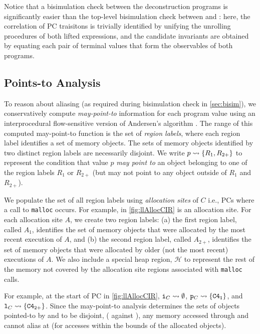 Notice that a bisimulation check between the deconstruction programs is
significantly easier than the top-level bisimulation check between \sprog{} and \cprog{}:
here, the correlation of PC traisitons is trivially identified by unifying the
unrolling procedures of both lifted expressions, and the candidate invariants
are obtained by equating each pair of terminal values that form the observables
of both programs.

\subsection{Points-to Analysis}
\label{sec:pointsTo}
To reason about aliasing (as required during bisimulation check in \cref{sec:bisim}),
we conservatively compute {\em may-point-to} information for each program value using
an interprocedural flow-sensitive version of Andersen's algorithm \cite{andersen94programanalysis}.
The range of this computed may-point-to function is the set of {\em region labels},
where each region label identifies a set of memory objects.
The sets of memory objects identified by two distinct region labels
are necessarily disjoint.
We write $p \rightsquigarrow{} \{ R_1, R_{2+} \}$ to represent the condition that value $p$
{\em may point to} an object belonging to one of the region labels $R_1$ or $R_{2+}$
(but may not point to any object outside of $R_1$ and $R_{2+}$).

We populate the set of all region labels using {\em allocation sites} of $C$
i.e., PCs where a call to {\tt malloc} occurs.
For example,  in \cref{fig:llAllocCIR} is an allocation site.
For each allocation site $A$, we create two region labels:
(a) the first region label, called $A_1$, identifies the set of memory objects
that were allocated by the most recent execution of $A$, and (b) the second region
label, called $A_{2+}$, identifies the set of memory objects that were allocated
by older (not the most recent) executions of $A$.
We also include a special heap region, $\mathcal{H}$ to represent
the rest of the memory not covered by the allocation site regions
associated with {\tt malloc} calls.

For example, at the start of PC  in \cref{fig:llAllocCIR},
${\tt i}_{C} \rightsquigarrow{} \emptyset$, ${\tt p}_{C} \rightsquigarrow{} \{ {\tt {\tt C4}_1} \}$,
and ${\tt l}_{C} \rightsquigarrow{} \{ {\tt {\tt C4}_{2+}} \}$.
Since the may-point-to analysis determines the sets of objects pointed-to
by  and  to be disjoint, ( against ),
any memory accessed through  and  cannot alias at 
(for accesses within the bounds of the allocated objects).


